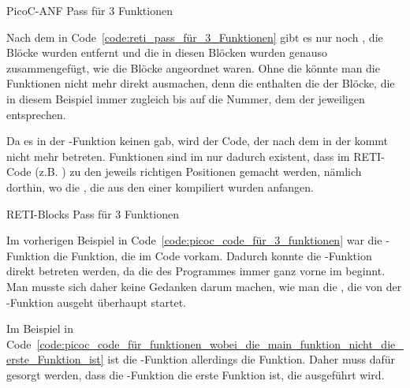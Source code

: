 \begin{code}
  \centering
  \caption{PicoC-ANF Pass für 3 Funktionen}
  \label{code:picoc_mon_pass_für_3_Funktionen}
\end{code}

Nach dem  in Code~\ref{code:reti_pass_für_3_Funktionen} gibt es nur noch , die Blöcke wurden entfernt und die  in diesen Blöcken wurden genauso zusammengefügt, wie die Blöcke angeordnet waren. Ohne die  könnte man die Funktionen nicht mehr direkt ausmachen, denn die  enthalten die   der Blöcke, die in diesem Beispiel immer zugleich bis auf die Nummer, dem  der jeweiligen  entsprechen.

Da es in der -Funktion keinen  gab, wird der Code, der nach dem  in der  kommt nicht mehr betreten. Funktionen sind im  nur dadurch existent, dass im RETI-Code  (z.B. ) zu den jeweils richtigen Positionen gemacht werden, nämlich dorthin, wo die , die aus den  einer  kompiliert wurden anfangen.

\begin{code}
  \centering
  \caption{RETI-Blocks Pass für 3 Funktionen}
  \label{code:reti_pass_für_3_Funktionen}
\end{code}


Im vorherigen Beispiel in Code~\ref{code:picoc_code_für_3_funktionen} war die -Funktion die  Funktion, die im Code vorkam. Dadurch konnte die -Funktion direkt betreten werden, da die  des Programmes immer ganz vorne im  beginnt. Man musste sich daher keine Gedanken darum machen, wie man die , die von der -Funktion ausgeht überhaupt startet.

Im Beispiel in Code~\ref{code:picoc_code_für_funktionen_wobei_die_main_funktion_nicht_die_erste_Funktion_ist} ist die -Funktion allerdings  die  Funktion. Daher muss dafür gesorgt werden, dass die -Funktion die erste Funktion ist, die ausgeführt wird.

